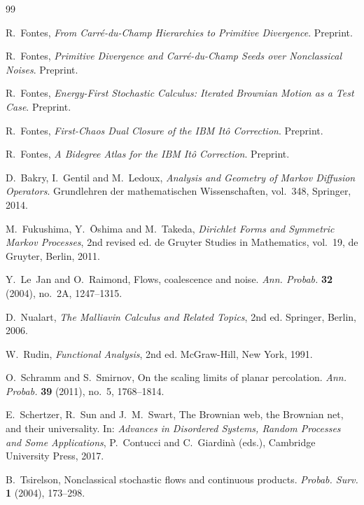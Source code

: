 \documentclass[11pt,reqno]{amsart}
\theoremstyle{plain}
\theoremstyle{definition}
\theoremstyle{remark}
\begin{document}
\begin{thebibliography}{99}

R.~Fontes,
\emph{From Carr\'e-du-Champ Hierarchies to Primitive Divergence}.
Preprint.

R.~Fontes,
\emph{Primitive Divergence and Carr\'e-du-Champ Seeds over Nonclassical Noises}.
Preprint.

R.~Fontes,
\emph{Energy-First Stochastic Calculus: Iterated Brownian Motion as a Test Case}.
Preprint.

R.~Fontes,
\emph{First-Chaos Dual Closure of the IBM It\^o Correction}.
Preprint.

R.~Fontes,
\emph{A Bidegree Atlas for the IBM It\^o Correction}.
Preprint.

D.~Bakry, I.~Gentil and M.~Ledoux,
\emph{Analysis and Geometry of Markov Diffusion Operators}.
Grundlehren der mathematischen Wissenschaften, vol.~348, Springer, 2014.

M.~Fukushima, Y.~\=Oshima and M.~Takeda,
\emph{Dirichlet Forms and Symmetric Markov Processes}, 2nd revised ed.
de Gruyter Studies in Mathematics, vol.~19, de Gruyter, Berlin, 2011.

Y.~Le~Jan and O.~Raimond,
Flows, coalescence and noise.
\emph{Ann. Probab.} \textbf{32} (2004), no.~2A, 1247--1315.

D.~Nualart,
\emph{The Malliavin Calculus and Related Topics}, 2nd ed.
Springer, Berlin, 2006.

W.~Rudin,
\emph{Functional Analysis}, 2nd ed.
McGraw-Hill, New York, 1991.

O.~Schramm and S.~Smirnov,
On the scaling limits of planar percolation.
\emph{Ann. Probab.} \textbf{39} (2011), no.~5, 1768--1814.

E.~Schertzer, R.~Sun and J.~M.~Swart,
The Brownian web, the Brownian net, and their universality.
In: \emph{Advances in Disordered Systems, Random Processes and Some Applications}, P.~Contucci and C.~Giardin\`a (eds.), Cambridge University Press, 2017.

B.~Tsirelson,
Nonclassical stochastic flows and continuous products.
\emph{Probab. Surv.} \textbf{1} (2004), 173--298.

\end{thebibliography}
\end{document}

